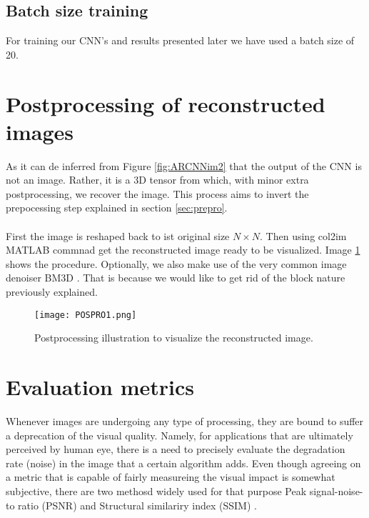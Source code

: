 \subsection{Batch size training}  
For training our CNN's and results presented later we have used a batch size of 20. 


\section{Postprocessing of reconstructed images}
As it can de inferred from Figure \ref{fig:ARCNNim2} that the output of the CNN is not an image. Rather, it is a 3D tensor from which, with minor extra postprocessing, we recover the image. This process aims to invert the prepocessing step explained in section \ref{sec:prepro}. \\\\

First the image is reshaped back to ist original size $N \times N$. Then using col2im MATLAB commnad get the reconstructed image ready to be visualized. Image \ref{fig:Posproim1} shows the procedure. Optionally, we also make use of the very common image denoiser BM3D \cite{dabov2007image}. That is because we would like to get rid of the block nature previously explained. 

\begin{figure}[tb] 
\centering 
\texttt{[image: POSPRO1.png]} 
\caption[Postprocessing of recovered images ]{Postprocessing illustration to visualize the reconstructed image.}
\label{fig:Posproim1} 
\end{figure}

\section{Evaluation metrics}
Whenever images are undergoing any type of processing, they are bound to suffer a deprecation of the visual quality. Namely, for applications that are ultimately perceived by human eye, there is a need to precisely evaluate the degradation rate (noise) in the image that a certain algorithm adds. Even though agreeing on a metric that is capable of fairly measureing the visual impact is somewhat subjective, there are two methosd widely used for that purpose Peak signal-noise-to ratio (PSNR) and Structural similariry index (SSIM) \cite{wang2004image}.     

